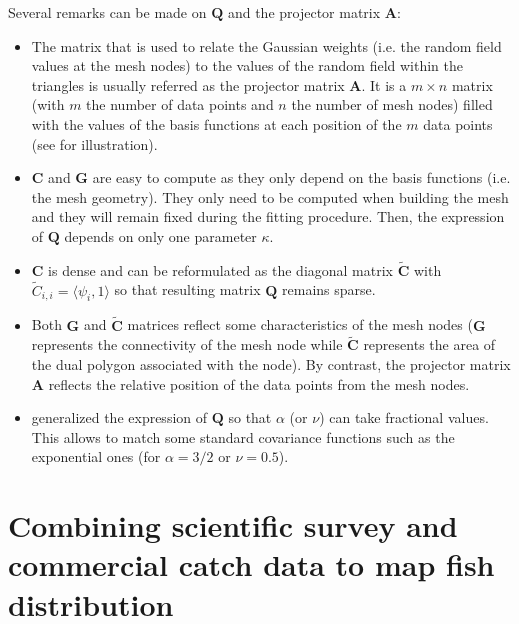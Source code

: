 Several remarks can be made on $\mathbf{Q}$ and the projector matrix $\mathbf{A}$:

\begin{itemize}

\item The matrix that is used to relate the Gaussian weights (i.e. the random field values at the mesh nodes) to the values of the random field within the triangles is usually referred as the projector matrix $\mathbf{A}$. It is a $m \times n$ matrix (with $m$ the number of data points and $n$ the number of mesh nodes) filled with the values of the basis functions at each position of the $m$ data points (see \textcite{krainski-advanced-2018} for illustration).

\item $\mathbf{C}$ and $\mathbf{G}$ are easy to compute as they only depend on the basis functions (i.e. the mesh geometry). They only need to be computed when building the mesh and they will remain fixed during the fitting procedure. Then, the expression of $\mathbf{Q}$ depends on only one parameter $\kappa$.

\item $\mathbf{C}$ is dense and can be reformulated as the diagonal matrix $\tilde{\mathbf{C}}$ with $\tilde C_{i,i}= \langle \psi_i,1 \rangle$ so that resulting matrix $\mathbf{Q}$ remains sparse.

\item Both $\mathbf{G}$ and $\tilde{\mathbf{C}}$ matrices reflect some characteristics of the mesh nodes ($\mathbf{G}$ represents the connectivity of the mesh node while $\tilde{\mathbf{C}}$ represents the area of the dual polygon associated with the node). By contrast, the projector matrix $\mathbf{A}$ reflects the relative position of the data points from the mesh nodes.

\item \textcite{lindgren-explicit-2011} generalized the expression of $\mathbf{Q}$ so that $\alpha$ (or $\nu$) can take fractional values. This allows to match some standard covariance functions such as the exponential ones (for $\alpha=3/2$ or $\nu=0.5$).
\end{itemize}

\newpage

\chapter{Combining scientific survey and commercial catch data to map fish distribution}


